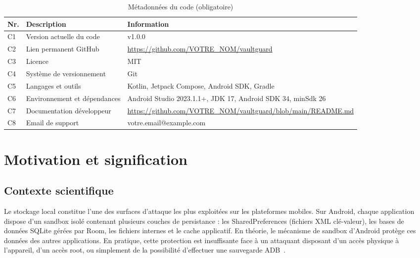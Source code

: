 \documentclass[preprint,12pt, a4paper]{elsarticle}
\begin{document}
\begin{table}[!h]
\begin{tabular}{|l|p{6.5cm}|p{6.5cm}|}
\hline
\textbf{Nr.} & \textbf{Description} & \textbf{Information} \\
\hline
C1 & Version actuelle du code & v1.0.0 \\
\hline
C2 & Lien permanent GitHub & \url{https://github.com/VOTRE_NOM/vaultguard} \\
\hline
C3 & Licence & MIT \\
\hline
C4 & Système de versionnement & Git \\
\hline
C5 & Langages et outils & Kotlin, Jetpack Compose, Android SDK, Gradle \\
\hline
C6 & Environnement et dépendances & Android Studio 2023.1.1+, JDK 17, Android SDK 34, minSdk 26 \\
\hline
C7 & Documentation développeur & \url{https://github.com/VOTRE_NOM/vaultguard/blob/main/README.md} \\
\hline
C8 & Email de support & votre.email@example.com \\
\hline
\end{tabular}
\caption{Métadonnées du code (obligatoire)}
\label{tab:metadata}
\end{table}


\section{Motivation et signification}

\subsection{Contexte scientifique}

Le stockage local constitue l'une des surfaces d'attaque les plus exploitées sur les plateformes mobiles. Sur Android, chaque application dispose d'un sandbox isolé contenant plusieurs couches de persistance : les SharedPreferences (fichiers XML clé-valeur), les bases de données SQLite gérées par Room, les fichiers internes et le cache applicatif. En théorie, le mécanisme de sandbox d'Android protège ces données des autres applications. En pratique, cette protection est insuffisante face à un attaquant disposant d'un accès physique à l'appareil, d'un accès root, ou simplement de la possibilité d'effectuer une sauvegarde ADB~\cite{owasp_mstg}.
\end{document}
